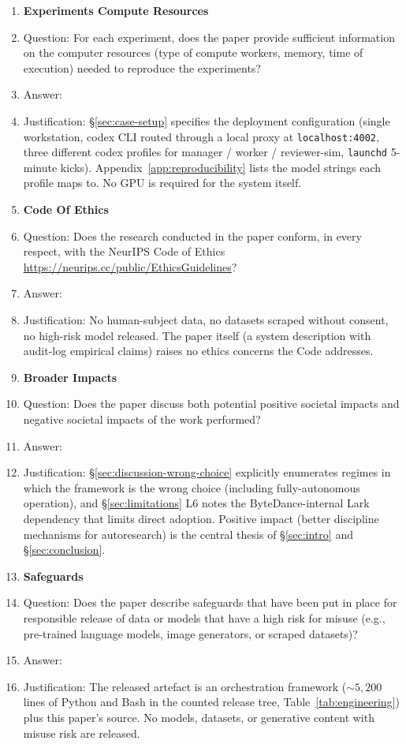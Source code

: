 \begin{enumerate}
\item {\bf Experiments Compute Resources}
    \item[] Question: For each experiment, does the paper provide sufficient information on the computer resources (type of compute workers, memory, time of execution) needed to reproduce the experiments?
    \item[] Answer: \answerYes{}
    \item[] Justification: \S\ref{sec:case-setup} specifies the deployment configuration (single workstation, codex CLI routed through a local proxy at \texttt{localhost:4002}, three different codex profiles for manager / worker / reviewer-sim, \texttt{launchd} 5-minute kicks). Appendix~\ref{app:reproducibility} lists the model strings each profile maps to. No GPU is required for the system itself.

\item {\bf Code Of Ethics}
    \item[] Question: Does the research conducted in the paper conform, in every respect, with the NeurIPS Code of Ethics \url{https://neurips.cc/public/EthicsGuidelines}?
    \item[] Answer: \answerYes{}
    \item[] Justification: No human-subject data, no datasets scraped without consent, no high-risk model released. The paper itself (a system description with audit-log empirical claims) raises no ethics concerns the Code addresses.

\item {\bf Broader Impacts}
    \item[] Question: Does the paper discuss both potential positive societal impacts and negative societal impacts of the work performed?
    \item[] Answer: \answerYes{}
    \item[] Justification: \S\ref{sec:discussion-wrong-choice} explicitly enumerates regimes in which the framework is the wrong choice (including fully-autonomous operation), and \S\ref{sec:limitations} L6 notes the ByteDance-internal Lark dependency that limits direct adoption. Positive impact (better discipline mechanisms for autoresearch) is the central thesis of \S\ref{sec:intro} and \S\ref{sec:conclusion}.

\item {\bf Safeguards}
    \item[] Question: Does the paper describe safeguards that have been put in place for responsible release of data or models that have a high risk for misuse (e.g., pre-trained language models, image generators, or scraped datasets)?
    \item[] Answer: \answerNA{}
    \item[] Justification: The released artefact is an orchestration framework (\(\sim\!5{,}200\) lines of Python and Bash in the counted release tree, Table~\ref{tab:engineering}) plus this paper's source. No models, datasets, or generative content with misuse risk are released.


\end{enumerate}
